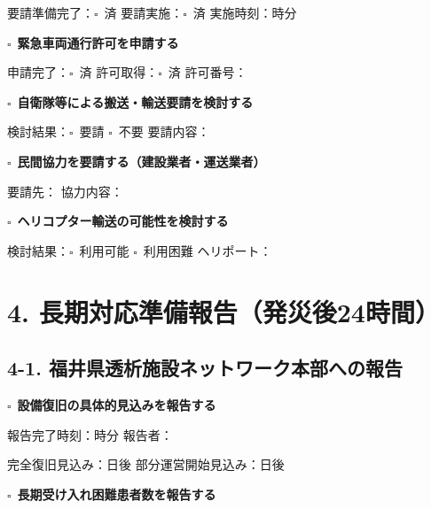 \documentclass[a4paper,12pt]{jarticle}
\newcommand{\checkbox}{$\square$\ }
\newcommand{\underlinespace}[1]{\underline{\hspace{#1}}}
\begin{document}
\quad 要請準備完了：\checkbox 済 \quad 要請実施：\checkbox 済 \quad 実施時刻：\underlinespace{1cm}時\underlinespace{1cm}分

\vspace{3mm}

\checkbox \textbf{緊急車両通行許可を申請する}

\quad 申請完了：\checkbox 済 \quad 許可取得：\checkbox 済 \quad 許可番号：\underlinespace{6cm}

\vspace{3mm}

\checkbox \textbf{自衛隊等による搬送・輸送要請を検討する}

\quad 検討結果：\checkbox 要請 \checkbox 不要 \quad 要請内容：\underlinespace{8cm}

\vspace{3mm}

\checkbox \textbf{民間協力を要請する（建設業者・運送業者）}

\quad 要請先：\underlinespace{8cm} \quad 協力内容：\underlinespace{6cm}

\vspace{3mm}

\checkbox \textbf{ヘリコプター輸送の可能性を検討する}

\quad 検討結果：\checkbox 利用可能 \checkbox 利用困難 \quad ヘリポート：\underlinespace{6cm}

\vspace{5mm}

\newpage

\section*{4. 長期対応準備報告（発災後24時間）}

\subsection*{4-1. 福井県透析施設ネットワーク本部への報告}

\checkbox \textbf{設備復旧の具体的見込みを報告する}

\quad 報告完了時刻：\underlinespace{1cm}時\underlinespace{1cm}分 \quad 報告者：\underlinespace{4cm}

\quad 完全復旧見込み：\underlinespace{2cm}日後 \quad 部分運営開始見込み：\underlinespace{2cm}日後

\vspace{4mm}

\checkbox \textbf{長期受け入れ困難患者数を報告する}
\end{document}
